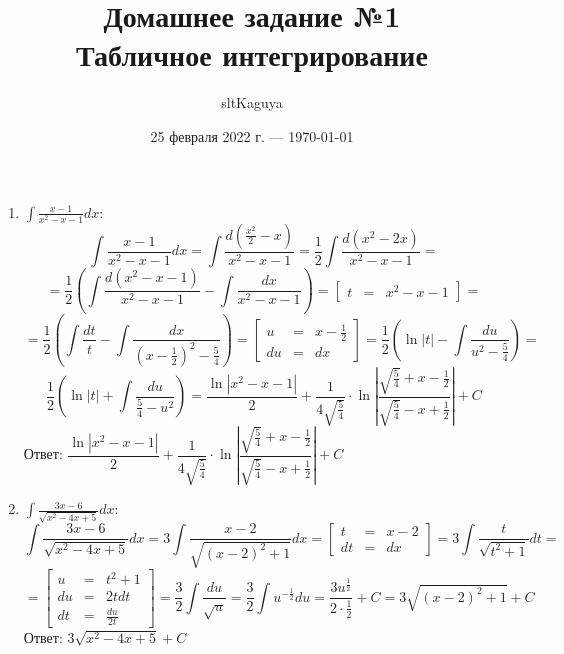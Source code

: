 \documentclass[a4paper,12pt]{article}
\title{Домашнее задание №1\\
    \large Табличное интегрирование}
\author{sltKaguya}
\date{25 февраля 2022 г. --- \today}
\begin{document}
\maketitle

\begin{enumerate}
    \item $\int\frac{x - 1}{x^2 - x - 1}dx$:
    $$\int\frac{x - 1}{x^2 - x - 1}dx = \int\frac{d(\frac{x^2}{2} - x)}{x^2 - x - 1} = \frac{1}{2}\int\frac{d(x^2 - 2x)}{x^2 - x - 1} =$$
    $$= \frac{1}{2}\left(\int\frac{d(x^2 - x - 1)}{x^2 - x - 1} - \int\frac{dx}{x^2 - x - 1}\right) = \left[\begin{array}{rcl}
        t & = & x^2 - x - 1
    \end{array}\right] =$$
    $$= \frac{1}{2}\left(\int\frac{dt}{t} - \int\frac{dx}{\left(x - \frac{1}{2}\right)^2 - \frac{5}{4}}\right) = \left[\begin{array}{rcl}
        u & = & x - \frac{1}{2} \\
        du & = & dx
    \end{array}\right] = \frac{1}{2}\left(\ln|t| - \int\frac{du}{u^2 - \frac{5}{4}}\right) =$$
    $$\frac{1}{2}\left(\ln|t| + \int\frac{du}{\frac{5}{4} - u^2}\right) = \dfrac{\ln|x^2 - x - 1|}{2} + \dfrac{1}{4\sqrt{\frac{5}{4}}}\cdot\ln\left|\dfrac{\sqrt{\frac{5}{4}} + x - \frac{1}{2}}{\sqrt{\frac{5}{4}} - x + \frac{1}{2}}\right|{} + C$$
    Ответ: $\dfrac{\ln|x^2 - x - 1|}{2} + \dfrac{1}{4\sqrt{\frac{5}{4}}}\cdot\ln\left|\dfrac{\sqrt{\frac{5}{4}} + x - \frac{1}{2}}{\sqrt{\frac{5}{4}} - x + \frac{1}{2}}\right|{} + C$

    \item $\int\frac{3x - 6}{\sqrt{x^2 - 4x + 5}}dx$:
    $$\int\dfrac{3x - 6}{\sqrt{x^2 - 4x + 5}}dx = 3\int\dfrac{x - 2}{\sqrt{\left(x - 2\right)^2 + 1}}dx = \left[\begin{array}{rcl}
        t & = & x - 2 \\
        dt & = & dx
    \end{array}\right] = 3\int\dfrac{t}{\sqrt{t^2 + 1}}dt =$$
    $$= \left[\begin{array}{rcl}
        u & = & t^2 + 1 \\
        du & = & 2tdt \\
        dt & = & \frac{du}{2t}
    \end{array}\right] = \frac{3}{2}\int\dfrac{du}{\sqrt{u}} = \frac{3}{2}\int u^{-\frac{1}{2}}du = \frac{3u^{\frac{1}{2}}}{2\cdot\frac{1}{2}} + C = 3\sqrt{(x - 2)^2 + 1}  + C$$
    Ответ: $3\sqrt{x^2 - 4x + 5}  + C$


\end{enumerate}
\end{document}
